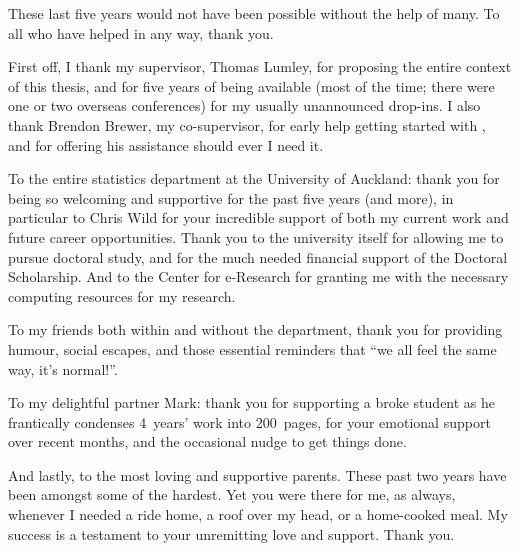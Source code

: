 These last five years would not have been possible without the help of many. To all who have helped in any way, thank you.

First off, I thank my supervisor, Thomas Lumley, for proposing the entire context of this thesis, and for five years of being available (most of the time; there were one or two overseas conferences) for my usually unannounced drop-ins. I also thank Brendon Brewer, my co-supervisor, for early help getting started with \Cpp{}, and for offering his assistance should ever I need it.


To the entire statistics department at the University of Auckland: thank you for being so welcoming and supportive for the past five years (and more), in particular to Chris Wild for your incredible support of both my current work and future career opportunities. Thank you to the university itself for allowing me to pursue doctoral study, and for the much needed financial support of the Doctoral Scholarship. And to the Center for e-Research for granting me with the necessary computing resources for my research.

To my friends both within and without the department, thank you for providing humour, social escapes, and those essential reminders that ``we all feel the same way, it's normal!''.

To my delightful partner Mark: thank you for supporting a broke student as he frantically condenses 4~years' work into 200~pages, for your emotional support over recent months, and the occasional nudge to get things done.

And lastly, to the most loving and supportive parents. These past two years have been amongst some of the hardest. Yet you were there for me, as always, whenever I needed a ride home, a roof over my head, or a home-cooked meal. My success is a testament to your unremitting love and support. Thank you.
